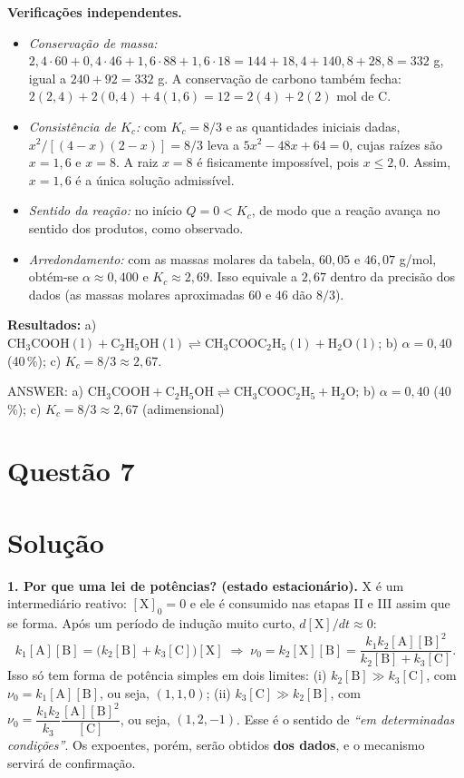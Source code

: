 \documentclass{article}%
\begin{document}
\textbf{Verificações independentes.}
\begin{itemize}
\item \emph{Conservação de massa:} $2{,}4\cdot 60+0{,}4\cdot 46+1{,}6\cdot 88+1{,}6\cdot 18=144+18{,}4+140{,}8+28{,}8=332$ g, igual a $240+92=332$ g. A conservação de carbono também fecha: $2(2{,}4)+2(0{,}4)+4(1{,}6)=12=2(4)+2(2)$ mol de C.
\item \emph{Consistência de $K_c$:} com $K_c=8/3$ e as quantidades iniciais dadas, $x^2/[(4-x)(2-x)]=8/3$ leva a $5x^2-48x+64=0$, cujas raízes são $x=1{,}6$ e $x=8$. A raiz $x=8$ é fisicamente impossível, pois $x\le 2{,}0$. Assim, $x=1{,}6$ é a única solução admissível.
\item \emph{Sentido da reação:} no início $Q=0<K_c$, de modo que a reação avança no sentido dos produtos, como observado.
\item \emph{Arredondamento:} com as massas molares da tabela, $60{,}05$ e $46{,}07$ g/mol, obtém-se $\alpha\approx 0{,}400$ e $K_c\approx 2{,}69$. Isso equivale a $2{,}67$ dentro da precisão dos dados (as massas molares aproximadas $60$ e $46$ dão $8/3$).
\end{itemize}

\textbf{Resultados:} a) $\mathrm{CH_3COOH(l)+C_2H_5OH(l)\rightleftharpoons CH_3COOC_2H_5(l)+H_2O(l)}$; b) $\alpha=0{,}40$ (40\,\%); c) $K_c=8/3\approx 2{,}67$.

\medskip
\noindent ANSWER: a) $\mathrm{CH_3COOH + C_2H_5OH \rightleftharpoons CH_3COOC_2H_5 + H_2O}$; b) $\alpha = 0{,}40$ (40\,\%); c) $K_c = 8/3 \approx 2{,}67$ (adimensional)%
\newpage%
\section*{Questão 7}

\section*{Solução}

\textbf{1. Por que uma lei de potências? (estado estacionário).} X é um intermediário reativo: $[\mathrm{X}]_0=0$ e ele é consumido nas etapas II e III assim que se forma. Após um período de indução muito curto, $d[\mathrm{X}]/dt\approx 0$:
\[
k_1[\mathrm{A}][\mathrm{B}]=\bigl(k_2[\mathrm{B}]+k_3[\mathrm{C}]\bigr)[\mathrm{X}]
\;\Rightarrow\;
\nu_0=k_2[\mathrm{X}][\mathrm{B}]=\frac{k_1k_2[\mathrm{A}][\mathrm{B}]^2}{k_2[\mathrm{B}]+k_3[\mathrm{C}]}.
\]
Isso só tem forma de potência simples em dois limites: (i) $k_2[\mathrm{B}]\gg k_3[\mathrm{C}]$, com $\nu_0=k_1[\mathrm{A}][\mathrm{B}]$, ou seja, $(1,1,0)$; (ii) $k_3[\mathrm{C}]\gg k_2[\mathrm{B}]$, com $\nu_0=\dfrac{k_1k_2}{k_3}\dfrac{[\mathrm{A}][\mathrm{B}]^2}{[\mathrm{C}]}$, ou seja, $(1,2,-1)$. Esse é o sentido de \emph{``em determinadas condições''}. Os expoentes, porém, serão obtidos \textbf{dos dados}, e o mecanismo servirá de confirmação.
\end{document}
